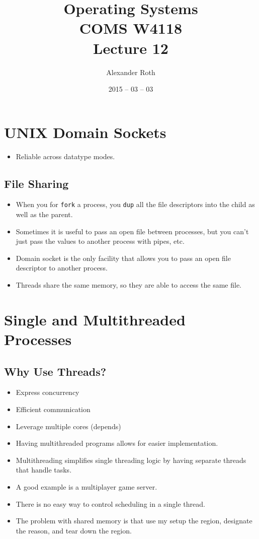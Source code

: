 \documentclass[]{article}
\begin{document}
\newcommand{\code}{\texttt}
\newtheorem{thm}{Theorem}
\title{Operating Systems \\ COMS W4118 \\ Lecture 12}
\author{Alexander Roth}
\date{2015 -- 03 -- 03}
\maketitle

\section{UNIX Domain Sockets}
\begin{itemize}
\item Reliable across datatype modes.
\end{itemize}

\subsection{File Sharing}
\begin{itemize}
\item When you for \code{fork} a process, you \code{dup} all the file
descriptors into the child as well as the parent.
\item Sometimes it is useful to pass an open file between processes, but you
can't just pass the values to another process with pipes, etc.
\item Domain socket is the only facility that allows you to pass an open file
descriptor to another process.
\item Threads share the same memory, so they are able to access the same file.
\end{itemize}

\section{Single and Multithreaded Processes}
\subsection{Why Use Threads?}
\begin{itemize}
\item Express concurrency
\item Efficient communication
\item Leverage multiple cores (depends)
\item Having multithreaded programs allows for easier implementation.
\item Multithreading simplifies single threading logic by having separate
threads that handle tasks.
\item A good example is a multiplayer game server.
\item There is no easy way to control scheduling in a single thread.
\item The problem with shared memory is that use my setup the region, designate
the reason, and tear down the region.
\end{itemize}
\end{document}
